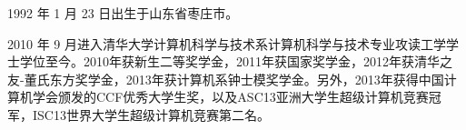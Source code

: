 \begin{resume}


  1992 年 1 月 23 日出生于山东省枣庄市。
  
  2010 年 9 月进入清华大学计算机科学与技术系计算机科学与技术专业攻读工学学士学位至今。2010年获新生二等奖学金，2011年获国家奖学金，2012年获清华之友-董氏东方奖学金，2013年获计算机系钟士模奖学金。另外，2013年获得中国计算机学会颁发的CCF优秀大学生奖，以及ASC13亚洲大学生超级计算机竞赛冠军，ISC13世界大学生超级计算机竞赛第二名。
  
\end{resume}
